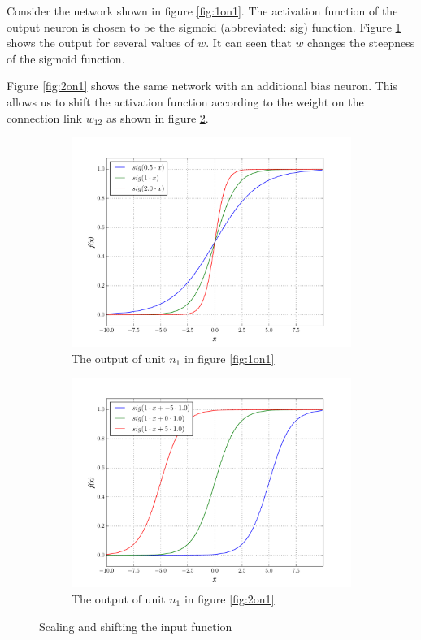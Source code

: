 \documentclass[10pt,a4paper,DIV=11]{scrreprt}
\begin{document}
Consider the network shown in figure \ref{fig:1on1}. The activation function of the output neuron is chosen to be the sigmoid (abbreviated: sig) 
function.  Figure \ref{fig:sigmoid-scale} shows the output for several values of $w$. It can seen that $w$ changes the steepness of the 
sigmoid function. 

Figure \ref{fig:2on1} shows the same network with an additional bias neuron. This allows us to shift the activation function according to the 
weight on the connection link $w_{12}$ as shown in figure \ref{fig:sigmoid-shift}.

\begin{figure}[H]

\centering
\begin{subfigure}{.5\textwidth}
  \centering
  \includegraphics[width=1.1\linewidth]{files/activation/sigsc.pdf}
  \caption{The output of unit $n_1$ in figure \ref{fig:1on1}}
  \label{fig:sigmoid-scale}
\end{subfigure}%
\begin{subfigure}{.5\textwidth}
  \centering
  \includegraphics[width=1.1\linewidth]{files/activation/sigsh.pdf}
  \caption{The output of unit $n_1$ in figure \ref{fig:2on1}}
  \label{fig:sigmoid-shift}
\end{subfigure}
\newline
\caption{Scaling and shifting the input function}
\label{fig:scaling}
\end{figure}
\end{document}
